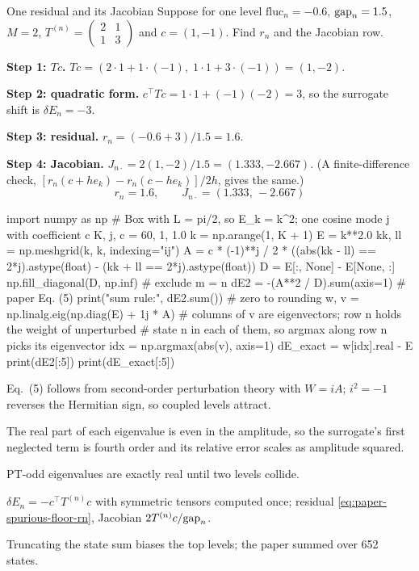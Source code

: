 \begin{sample}{One residual and its Jacobian}
Suppose for one level $\mathrm{fluc}_n=-0.6$, $\mathrm{gap}_n=1.5$, $M=2$, $T^{(n)}=\begin{pmatrix}2&1\\1&3\end{pmatrix}$ and $c=(1,-1)$. Find $r_n$ and the Jacobian row.

\textbf{Step 1: $T c$.} $T c=(2\cdot1+1\cdot(-1),\;1\cdot1+3\cdot(-1))=(1,-2)$.

\textbf{Step 2: quadratic form.} $c^\top Tc=1\cdot1+(-1)(-2)=3$, so the surrogate shift is $\delta E_n=-3$.

\textbf{Step 3: residual.} $r_n=(-0.6+3)/1.5=1.6$.

\textbf{Step 4: Jacobian.} $J_{n\cdot}=2(1,-2)/1.5=(1.333,-2.667)$. (A finite-difference check, $[r_n(c+he_k)-r_n(c-he_k)]/2h$, gives the same.)
\[
\boxed{r_n=1.6,\qquad J_{n\cdot}=(1.333,\,-2.667)}
\]
\end{sample}

\begin{pycode}
import numpy as np
# Box with L = pi/2, so E_k = k^2; one cosine mode j with coefficient c
K, j, c = 60, 1, 1.0
k = np.arange(1, K + 1)
E = k**2.0
kk, ll = np.meshgrid(k, k, indexing="ij")
A = c * (-1)**j / 2 * ((abs(kk - ll) == 2*j).astype(float)
                       - (kk + ll == 2*j).astype(float))
D = E[:, None] - E[None, :]
np.fill_diagonal(D, np.inf)          # exclude m = n
dE2 = -(A**2 / D).sum(axis=1)        # paper Eq. (5)
print("sum rule:", dE2.sum())        # zero to rounding
w, v = np.linalg.eig(np.diag(E) + 1j * A)
# columns of v are eigenvectors; row n holds the weight of unperturbed
# state n in each of them, so argmax along row n picks its eigenvector
idx = np.argmax(abs(v), axis=1)
dE_exact = w[idx].real - E
print(dE2[:5])
print(dE_exact[:5])
\end{pycode}

\begin{keyideas}
\item Eq.~(5) follows from second-order perturbation theory with $W=iA$; $i^2=-1$ reverses the Hermitian sign, so coupled levels attract.
\item The real part of each eigenvalue is even in the amplitude, so the surrogate's first neglected term is fourth order and its relative error scales as amplitude squared.
\item PT-odd eigenvalues are exactly real until two levels collide.
\item $\delta E_n=-c^\top T^{(n)}c$ with symmetric tensors computed once; residual \cref{eq:paper-spurious-floor-rn}, Jacobian $2T^{(n)}c/\mathrm{gap}_n$.
\item Truncating the state sum biases the top levels; the paper summed over 652 states.
\end{keyideas}

